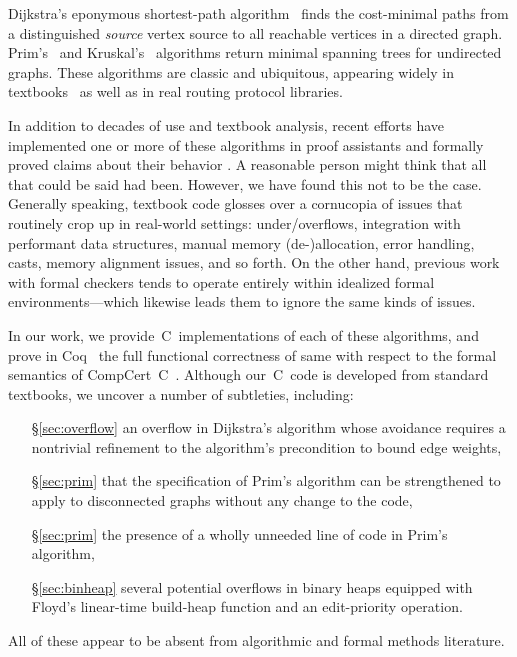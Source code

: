 Dijkstra's eponymous shortest-path algorithm~\cite{DBLP:journals/nm/Dijkstra59} finds
the cost-minimal paths from a distinguished \emph{source} vertex
source to all reachable vertices in a directed graph. Prim's~\cite{prim} and Kruskal's~\cite{kruskal} algorithms return minimal spanning trees for undirected graphs.
These algorithms are classic and ubiquitous, appearing widely in textbooks~\cite{clrs,DBLP:books/daglib/0022194,heineman2008algorithms,rozen,kepnergilbert,sedgewick} as well as in real routing protocol libraries.

In addition to decades of use and textbook analysis, recent efforts have implemented one or more of these algorithms in proof 
assistants and formally proved claims about their behavior \cite{Mizar,ACL2,Coq,cite,cite,cite}.  A reasonable person might think that all 
that could be said had been.  However, we have found this not to be the case.  Generally speaking, textbook code glosses over a cornucopia 
of issues that routinely crop up in real-world settings: under/overflows, integration with performant data structures, manual memory (de-)allocation, 
error handling, casts, memory alignment issues, and so forth.  On the other hand, previous work with formal checkers tends to operate entirely 
within idealized formal environments---which likewise leads them to ignore the same kinds of issues.

In our work, we provide~C~implementations of each of these algorithms, and prove in Coq~\cite{coq} the full functional correctness of same with respect to
the formal semantics of CompCert~C~\cite{leroy:compcert}.  Although our~C~code is developed from standard textbooks, we uncover a number of subtleties, including:
\begin{itemize}
\item[\S\ref{sec:overflow}] an overflow in Dijkstra's algorithm whose avoidance requires a nontrivial refinement to the algorithm's precondition to bound edge weights,
\item[\S\ref{sec:prim}] that the specification of Prim's algorithm can be strengthened to apply to disconnected graphs without any change to the code,
\item[\S\ref{sec:prim}] the presence of a wholly unneeded line of code in Prim's algorithm,
\item[\S\ref{sec:binheap}] several potential overflows in binary heaps equipped with Floyd's linear-time build-heap function and an edit-priority operation.
\end{itemize}
All of these appear to be absent from algorithmic and formal methods literature.

